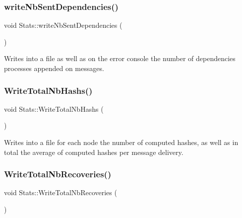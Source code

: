 \subsubsection{\texorpdfstring{write\+Nb\+Sent\+Dependencies()}{writeNbSentDependencies()}}
{\footnotesize\ttfamily void Stats\+::write\+Nb\+Sent\+Dependencies (\begin{DoxyParamCaption}{ }\end{DoxyParamCaption})\hspace{0.3cm}{\ttfamily [private]}}



Writes into a file as well as on the error console the number of dependencies processes appended on messages. 

\mbox{\label{class_stats_a89cedfe36937b0f9a5f525a8858e54f2}} 
\subsubsection{\texorpdfstring{Write\+Total\+Nb\+Hashs()}{WriteTotalNbHashs()}}
{\footnotesize\ttfamily void Stats\+::\+Write\+Total\+Nb\+Hashs (\begin{DoxyParamCaption}{ }\end{DoxyParamCaption})\hspace{0.3cm}{\ttfamily [private]}}



Writes into a file for each node the number of computed hashes, as well as in total the average of computed hashes per message delivery. 

\mbox{\label{class_stats_a75689d1481b0605ce74d775e36c21740}} 
\subsubsection{\texorpdfstring{Write\+Total\+Nb\+Recoveries()}{WriteTotalNbRecoveries()}}
{\footnotesize\ttfamily void Stats\+::\+Write\+Total\+Nb\+Recoveries (\begin{DoxyParamCaption}{ }\end{DoxyParamCaption})\hspace{0.3cm}{\ttfamily [private]}}



